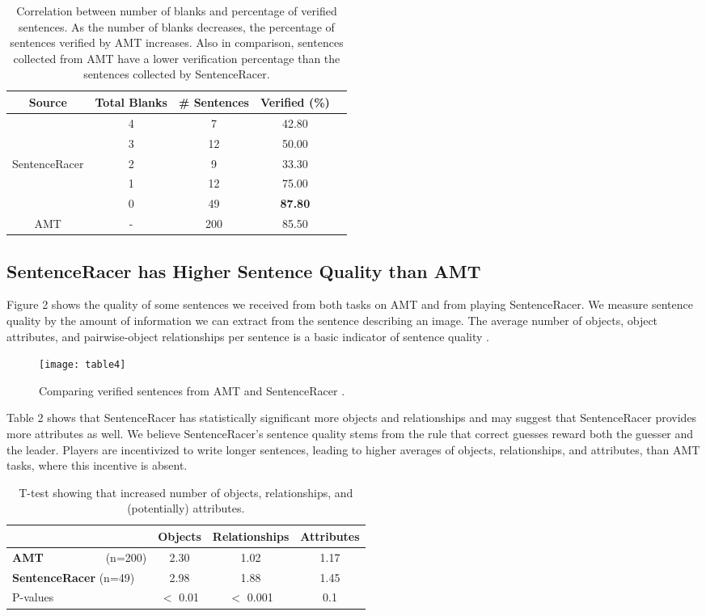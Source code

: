 \documentclass[preprint]{sigchi}
\begin{document}
\begin{table}[h!]
\centering
\begin{tabular}{|c|c|c|c|c|}
\hline
Source & Total Blanks & \# Sentences & Verified (\%) \\ \hline
& 4 & 7 & 42.80 \\
& 3 & 12 & 50.00 \\
SentenceRacer & 2 & 9 & 33.30 \\
& 1 & 12 & 75.00 \\
& 0 & 49 & \textbf{87.80} \\ \hline \hline
AMT & - & 200 & 85.50 \\ \hline
\end{tabular}
\caption{Correlation between number of blanks and percentage of verified sentences. As the number of blanks decreases, the percentage of sentences verified by AMT increases. Also in comparison, sentences collected from AMT have a lower verification percentage than the sentences collected by SentenceRacer.}
\end{table}

\subsection{SentenceRacer has Higher Sentence Quality than AMT}


Figure 2 shows the quality of some sentences we received from both tasks on AMT and from playing SentenceRacer. We measure sentence quality by the amount of information we can extract from the sentence describing an image. The average number of objects, object attributes, and pairwise-object relationships per sentence is a basic indicator of sentence quality \cite{scenegraph}. 
\begin{figure}[h!]
\centering
\texttt{[image: table4]}
\caption{Comparing verified sentences from AMT and SentenceRacer .} 
\label{fig-example}
\end{figure}
Table 2 shows that SentenceRacer has statistically significant more objects and relationships and may suggest that SentenceRacer provides more attributes as well. We believe SentenceRacer's sentence quality stems from the rule that correct guesses reward both the guesser and the leader. Players are incentivized to write longer sentences, leading to higher averages of objects, relationships, and attributes, than AMT tasks, where this incentive is absent.

\begin{table}[h!]
\centering
\begin{tabular}{|C{2.5cm}|c|c|c|}
  \hline
& Objects & Relationships & Attributes\\ \hline
\textbf{AMT}\ \ \ \ \ \ \ \ \ \ \ (n=200) & 2.30 & 1.02 & 1.17 \\ \hline
\textbf{SentenceRacer} (n=49) & 2.98 & 1.88 & 1.45 \\ \hline
P-values & $<$ 0.01 & $<$ 0.001 & 0.1 \\ \hline
\end{tabular}
\caption{T-test showing that increased number of objects, relationships, and (potentially) attributes.}
\end{table}
\end{document}
